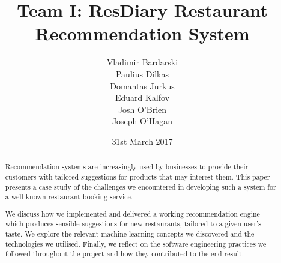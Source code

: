 \documentclass{l3proj}
\begin{document}
\title{Team I: ResDiary Restaurant Recommendation System}

\author{Vladimir Bardarski \\
        Paulius Dilkas \\
        Domantas Jurkus \\
        Eduard Kalfov \\
        Josh O'Brien \\
		Joseph O'Hagan}

\date{31st March 2017}

\maketitle

\begin{abstract}
Recommendation systems are increasingly used by businesses to provide their customers with tailored suggestions for products that may interest them. This paper presents a case study of the challenges we encountered in developing such a system for a well-known restaurant booking service. 

We discuss how we implemented and delivered a working recommendation engine which produces sensible suggestions for new restaurants, tailored to a given user's taste. We explore the relevant machine learning concepts we discovered and the technologies we utilised. Finally, we reflect on the software engineering practices we followed throughout the project and how they contributed to the end result.
\end{abstract}

\end{document}
